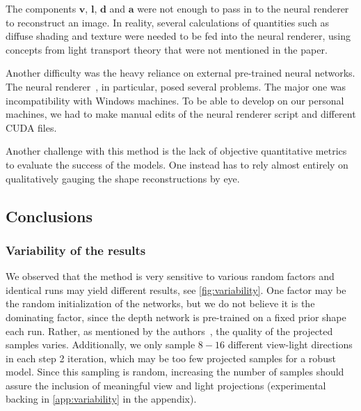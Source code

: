 The components $\textbf{v}$, $\textbf{l}$, $\textbf{d}$ and $\textbf{a}$ were not enough to pass in to the neural renderer to reconstruct an image. In reality, several calculations of quantities such as diffuse shading and texture were needed to be fed into the neural renderer, using concepts from light transport theory that were not mentioned in the paper.

Another difficulty was the heavy reliance on external pre-trained neural networks. 
The neural renderer~\cite{neural-renderer}, in particular, posed several problems. The major one was incompatibility with Windows machines. To be able to develop on our personal machines, we had to make manual edits of the neural renderer script and different CUDA files.

Another challenge with this method is the lack of objective quantitative metrics to evaluate the success of the models. One instead has to rely almost entirely on qualitatively gauging the shape reconstructions by eye.

\subsection{Conclusions}

\subsubsection{Variability of the results}
\label{sec:variability}
We observed that the method is very sensitive to various random factors and identical runs may yield different results, see \autoref{fig:variability}. One factor may be the random initialization of the networks, but we do not believe it is the dominating factor, since the depth network is pre-trained on a fixed prior shape each run. Rather, as mentioned by the authors~\cite{gan2shape}, the quality of the projected samples varies. 
Additionally, we only sample $8-16$ different view-light directions in each step 2 iteration, which may be too few projected samples for a robust model. Since this sampling is random, increasing the number of samples should assure the inclusion of meaningful view and light projections (experimental backing in \autoref{app:variability} in the appendix).

